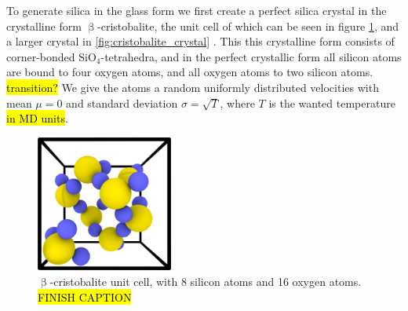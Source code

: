 To generate silica in the glass form we first create a perfect silica crystal in the crystalline form $\upbeta$-cristobalite, the unit cell of which can be seen in figure \cref{fig:beta_cristobalite-unit_cell}, and a larger crystal in \cref{fig:cristobalite_crystal} . This this crystalline form consists of corner-bonded SiO$_4$-tetrahedra, and in the perfect crystallic form all silicon atoms are bound to four oxygen atoms, and all oxygen atoms to two silicon atoms. \hl{transition?} We give the atoms a random uniformly distributed velocities with mean $\mu = 0$ and standard deviation $\sigma = \sqrt{T}$, where $T$ is the wanted temperature \hl{in MD units}.
%
\begin{figure}[htpb]%
    \centering%
    \includegraphics[width=0.4\textwidth]{images/beta_cristobalite/unit_cell05_cropped.png}%
    \caption{%
        $\upbeta$-cristobalite unit cell, with 8 silicon atoms and 16 oxygen atoms. \hl{FINISH CAPTION}%
    }%
    \label{fig:beta_cristobalite-unit_cell}%
\end{figure}%

